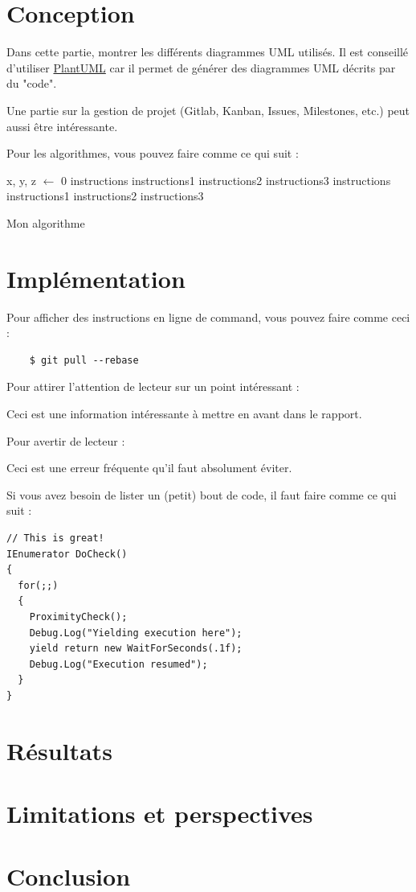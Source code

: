\chapter{Conception}
Dans cette partie, montrer les différents diagrammes UML utilisés.
Il est conseillé d'utiliser \href{https://plantuml.com/}{PlantUML} car il permet de générer des diagrammes UML décrits par du "code".

Une partie sur la gestion de projet (Gitlab, Kanban, Issues, Milestones, etc.) peut aussi être intéressante.

Pour les algorithmes, vous pouvez faire comme ce qui suit :

\begin{algorithm}[H]
\SetAlgoLined
{}
x, y, z $\leftarrow$ 0\;
{
  instructions\;  
  {
    instructions1\;
    instructions2\;
  }
  {
   instructions3\;
  }
}
{
  instructions\;  
  {
    instructions1\;
    instructions2\;
  }
  {
   instructions3\;
  }
}
\caption{Mon algorithme}
\end{algorithm}

\chapter{Implémentation}
Pour afficher des instructions en ligne de command, vous pouvez faire comme ceci :
\begin{commandline}
  \begin{verbatim}
	$ git pull --rebase
	\end{verbatim}
\end{commandline}

Pour attirer l'attention de lecteur sur un point intéressant :
\begin{info}
 	Ceci est une information intéressante à mettre en avant dans le rapport.
\end{info}

Pour avertir de lecteur :
\begin{warn}
 	Ceci est une erreur fréquente qu'il faut absolument éviter.
\end{warn}

Si vous avez besoin de lister un (petit) bout de code, il faut faire comme ce qui suit :
\begin{lstlisting}
// This is great!
IEnumerator DoCheck() 
{
  for(;;)
  {
    ProximityCheck();
    Debug.Log("Yielding execution here");
    yield return new WaitForSeconds(.1f);
    Debug.Log("Execution resumed");
  }
}
\end{lstlisting}

\chapter{Résultats}

\chapter{Limitations et perspectives}

\chapter{Conclusion}